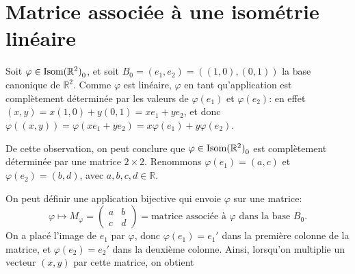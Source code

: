\documentclass{book}
\numberwithin{equation}{section}
\renewcommand{\phi}{\varphi}
\providecommand{\plan}{{\mathbb R^2}}
\providecommand{\isom}{{\textnormal{Isom}(\plan)}}
\providecommand{\isomo}{{\isom_0}}
\begin{document}
\section{Matrice associée à une isométrie linéaire}
Soit $\phi \in \isomo$, et soit $B_0 = (e_1, e_2) = ((1, 0), (0, 1))$ la base canonique de $\plan$. Comme $\phi$ est linéaire, $\phi$ en tant qu'application est complètement déterminée par les valeurs de $\phi(e_1)$ et $\phi(e_2)$: en effet $(x, y) = x(1, 0) + y(0, 1) = xe_1 + ye_2$, et donc $\phi((x, y)) = \phi(xe_1 + ye_2) = x\phi(e_1) + y\phi(e_2)$.\par
De cette observation, on peut conclure que $\phi \in \isomo$ est complètement déterminée par une matrice $2 \times 2$. Renommons $\phi(e_1) = (a, c)$ et $\phi(e_2) = (b, d)$, avec $a, b, c, d \in \mathbb R$.\par
On peut définir une application bijective qui envoie $\phi$ sur une matrice:
\begin{equation*}
	\phi \mapsto M_\phi = \begin{pmatrix}
		a & b\\
		c & d
	\end{pmatrix}
	= \text{matrice associée à $\phi$ dans la base $B_0$}.
\end{equation*}
On a placé l'image de $e_1$ par $\phi$, donc $\phi(e_1) = e_1'$ dans la première colonne de la matrice, et $\phi(e_2) = e_2'$ dans la deuxième colonne. Ainsi, lorsqu'on multiplie un vecteur $(x, y)$ par cette matrice, on obtient
\end{document}

